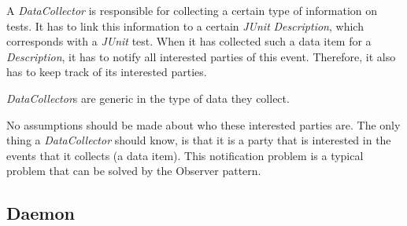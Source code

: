 \documentclass[i2]{oss}
\newcommand{\class}[1]{\emph{#1}}
\newcommand{\junit}{\emph{JUnit }}
\begin{document}
A \class{DataCollector} is responsible for collecting a certain type of information on tests.
It has to link this information to a certain \junit \class{Description}, which corresponds with a \junit test. %
When it has collected such a data item for a \class{Description}, it has to notify all interested parties of this event.
Therefore, it also has to keep track of its interested parties.

\class{DataCollector}s are generic in the type of data they collect.

No assumptions should be made about who these interested parties are. The only thing a \class{DataCollector} should  know, is that it is a party that is interested in the events that it collects (a data item). This notification problem is a typical problem that can be solved by the Observer pattern.\\



\subsection{Daemon}
\label{subssec: deamon}
\end{document}
